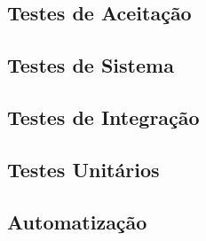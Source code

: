 \subsection{Testes de Aceitação}
\subsection{Testes de Sistema}
\subsection{Testes de Integração}
\subsection{Testes Unitários}
\subsection{Automatização}
